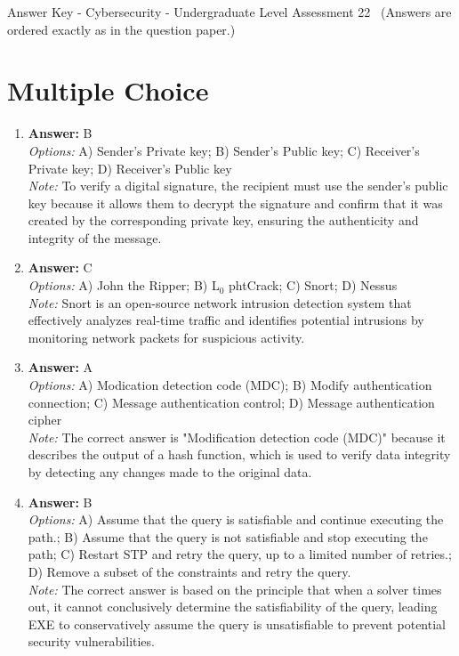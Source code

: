 \documentclass[12pt]{article}
\begin{document}
\begin{center}
Answer Key - Cybersecurity - Undergraduate Level Assessment 22 \
\small (Answers are ordered exactly as in the question paper.)
\end{center}

\section*{Multiple Choice}
\begin{enumerate}[label=\arabic*.]
\item \textbf{Answer:} B
\\ \textit{Options:} A) Sender's Private key; B) Sender's Public key; C) Receiver's Private key; D) Receiver's Public key
\\ \textit{Note:} To verify a digital signature, the recipient must use the sender's public key because it allows them to decrypt the signature and confirm that it was created by the corresponding private key, ensuring the authenticity and integrity of the message.
\item \textbf{Answer:} C
\\ \textit{Options:} A) John the Ripper; B) L$_{0}$ phtCrack; C) Snort; D) Nessus
\\ \textit{Note:} Snort is an open-source network intrusion detection system that effectively analyzes real-time traffic and identifies potential intrusions by monitoring network packets for suspicious activity.
\item \textbf{Answer:} A
\\ \textit{Options:} A) Modication detection code (MDC); B) Modify authentication connection; C) Message authentication control; D) Message authentication cipher
\\ \textit{Note:} The correct answer is "Modification detection code (MDC)" because it describes the output of a hash function, which is used to verify data integrity by detecting any changes made to the original data.
\item \textbf{Answer:} B
\\ \textit{Options:} A) Assume that the query is satisfiable and continue executing the path.; B) Assume that the query is not satisfiable and stop executing the path; C) Restart STP and retry the query, up to a limited number of retries.; D) Remove a subset of the constraints and retry the query.
\\ \textit{Note:} The correct answer is based on the principle that when a solver times out, it cannot conclusively determine the satisfiability of the query, leading EXE to conservatively assume the query is unsatisfiable to prevent potential security vulnerabilities.

\end{enumerate}
\end{document}
